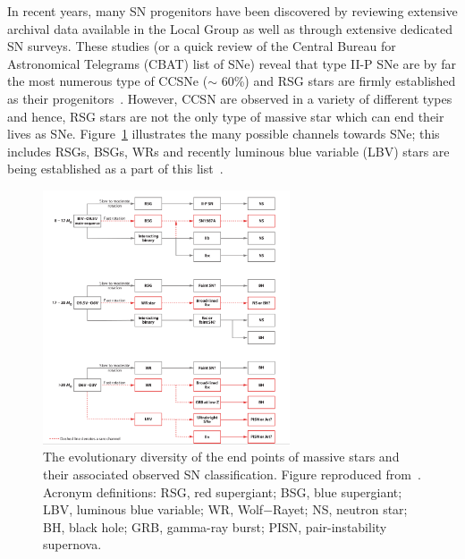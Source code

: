 In recent years, many SN progenitors have been discovered by reviewing extensive archival data available in the Local Group as well as through extensive dedicated SN surveys.
These studies (or a quick review of the Central Bureau for Astronomical Telegrams (CBAT) list of SNe\footnotemark) reveal that type II-P SNe are by far the most numerous type of CCSNe ($\sim$ 60\%) and RSG stars are firmly established as their progenitors~\citep[][and references therein]{Smartt09}.
However, CCSN are observed in a variety of different types and hence, RSG stars are not the only type of massive star which can end their lives as SNe.
Figure~\ref{fig:SNe-Smartt} illustrates the many possible channels towards SNe; this includes RSGs, BSGs, WRs and recently luminous blue variable (LBV) stars are being established as a part of this list~\citep[e.g.][]{Smartt09, Groh13}.


 \begin{figure}
 \centering
 \includegraphics[width=0.65\textwidth]{intro/Smartt09fig12}
 \caption[HRD]{The evolutionary diversity of the end points of massive stars and their associated observed SN classification. Figure reproduced from~\cite{Smartt09}. Acronym definitions: RSG, red supergiant; BSG, blue supergiant; LBV, luminous blue variable; WR, Wolf$-$Rayet; NS, neutron star; BH, black hole; GRB, gamma-ray burst; PISN, pair-instability supernova.
 \label{fig:SNe-Smartt}}
\end{figure}

